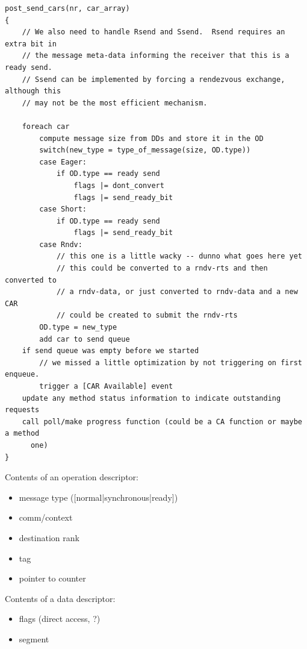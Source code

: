 \documentclass[11pt,letterpaper]{article}
\begin{document}
\begin{verbatim}
post_send_cars(nr, car_array)
{
    // We also need to handle Rsend and Ssend.  Rsend requires an extra bit in
    // the message meta-data informing the receiver that this is a ready send.
    // Ssend can be implemented by forcing a rendezvous exchange, although this
    // may not be the most efficient mechanism.

    foreach car
        compute message size from DDs and store it in the OD
        switch(new_type = type_of_message(size, OD.type))
        case Eager:
            if OD.type == ready send
                flags |= dont_convert
                flags |= send_ready_bit
        case Short:
            if OD.type == ready send
                flags |= send_ready_bit
        case Rndv:
            // this one is a little wacky -- dunno what goes here yet
            // this could be converted to a rndv-rts and then converted to
            // a rndv-data, or just converted to rndv-data and a new CAR
            // could be created to submit the rndv-rts
        OD.type = new_type
        add car to send queue
    if send queue was empty before we started
        // we missed a little optimization by not triggering on first enqueue.
        trigger a [CAR Available] event
    update any method status information to indicate outstanding requests
    call poll/make progress function (could be a CA function or maybe a method 
      one)
}
\end{verbatim}

Contents of an operation descriptor:
\begin{itemize}
\item message type ([normal|synchronous|ready])
\item comm/context
\item destination rank
\item tag
\item pointer to counter
\end{itemize}

Contents of a data descriptor:
\begin{itemize}
\item flags (direct access, ?)
\item segment
\end{itemize}

\end{document}
